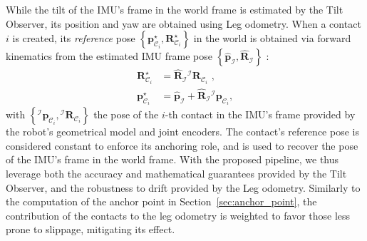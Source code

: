 \documentclass{IJCAS}
\begin{document}
While the tilt of the IMU's frame in the world frame is estimated by the Tilt Observer, its position and yaw are obtained using Leg odometry. When a contact $i$ is created, its \emph{reference} pose $\left\{ \boldsymbol{p}^{\star}_{\mathcal{C}_{i}}, \boldsymbol{R}^{\star}_{\mathcal{C}_{i}}\right\}$ in the world is obtained via forward kinematics from the estimated IMU frame pose $\left\{ \hat{\boldsymbol{p}}_{\mathcal{I}}, \hat{\boldsymbol{R}}_{\mathcal{I}}\right\}$ :
\begin{align}
  \boldsymbol{R}^{\star}_{\mathcal{C}_{i}}  & = \hat{\boldsymbol{R}}_{\mathcal{I}}  {}^{\mathcal{I}} \boldsymbol{R}_{\mathcal{C}_{i}}  \text{ ,}\\
    \boldsymbol{p}^{\star}_{{\mathcal{C}}_{i}}   & = \hat{\boldsymbol{p}}_{\mathcal{I}} + \hat{\boldsymbol{R}}_{\mathcal{I}} {}^{\mathcal{I}}\boldsymbol{p}_{{\mathcal{C}}_{i}} ,
\end{align}
with $\left\{ {}^{\mathcal{I}}\boldsymbol{p}_{{\mathcal{C}}_{i}}, {}^{\mathcal{I}} \boldsymbol{R}_{\mathcal{C}_{i}} \right\}$ the pose of the $i$-th contact in the IMU's frame provided by the robot's geometrical model and joint encoders.
The contact's reference pose is considered constant to enforce its anchoring role, and is used to recover the pose of the IMU's frame in the world frame. 
With the proposed pipeline, we thus leverage both the accuracy and mathematical guarantees provided by the Tilt Observer, and the robustness to drift provided by the Leg odometry. Similarly to the computation of the anchor point in Section~\ref{sec:anchor_point}, the contribution of the contacts to the leg odometry is weighted to favor those less prone to slippage, mitigating its effect.
\end{document}
